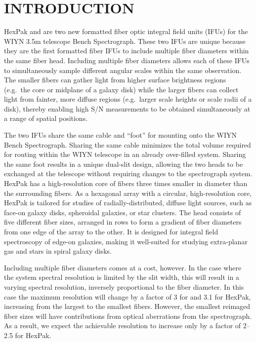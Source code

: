 \section{INTRODUCTION}
\label{GPB:sec:intro}
HexPak and \GP are two new formatted fiber optic integral field units
(IFUs) for the WIYN 3.5m telescope Bench Spectrograph\footnotemark.
  These two IFUs are unique because they are
the first formatted fiber IFUs to include multiple fiber diameters within the
same fiber head.  Including multiple fiber diameters allows each of these IFUs
to simultaneously sample different angular scales within the same observation.
The smaller fibers can gather light from higher surface brightness regions
(e.g.\ the core or midplane of a galaxy disk) while the larger fibers can
collect light from fainter, more diffuse regions (e.g.\ larger scale heights
or scale radii of a disk), thereby enabling high S/N measurements to be
obtained simultaneously at a range of spatial positions.


The two IFUs share the same cable and ``foot'' for mounting onto the WIYN
Bench Spectrograph.  Sharing the same cable minimizes the total volume
required for routing within the WIYN telescope in an already over-filled
system.  Sharing the same foot results in a unique dual-slit design, allowing
the two heads to be exchanged at the telescope without requiring changes to
the spectrograph system.  HexPak has a high-resolution core of fibers three
times smaller in diameter than the surrounding fibers.  As a hexagonal array
with a circular, high-resolution core, HexPak is tailored for studies of
radially-distributed, diffuse light sources, such as face-on galaxy disks,
spheroidal galaxies, or star clusters.  The \GP head consists of five
different fiber sizes, arranged in rows to form a gradient of fiber diameters
from one edge of the array to the other.  It is designed for integral field
spectroscopy of edge-on galaxies, making it well-suited for studying
extra-planar gas and stars in spiral galaxy disks.


Including multiple fiber diameters comes at a cost, however.  In the case
where the system spectral resolution is limited by the slit width, this will
result in a varying spectral resolution, inversely proportional to the fiber
diameter.  In this case the maximum resolution will change by a factor of 3
for \GP and 3.1 for HexPak, increasing from the largest to the smallest
fibers.  However, the smallest reimaged fiber sizes will have contributions
from optical aberrations from the spectrograph. As a result, we expect the
achievable resolution to increase only by a factor of 2--2.5 for HexPak.

